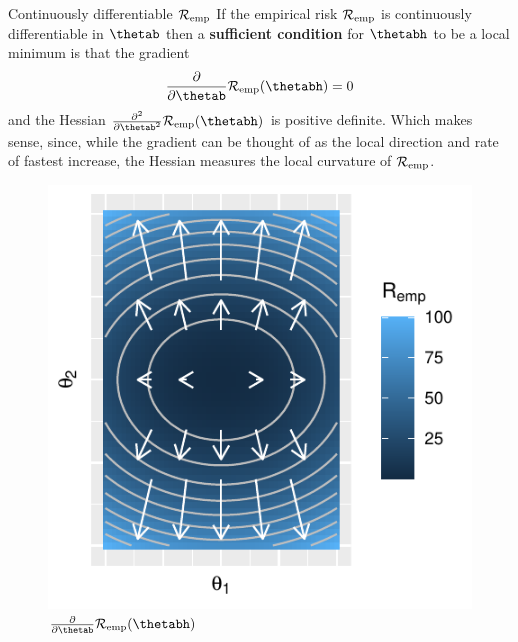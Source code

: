 \documentclass[11pt,compress,t,notes=noshow, xcolor=table]{beamer}
\begin{document}
\begin{vbframe}{Continuously differentiable $\mathcal{R}_{\text{emp}}$}
\footnotesize
If the empirical risk $\mathcal{R}_{\text{emp}}$ is continuously differentiable in $\thetab$ then a \textbf{sufficient condition} for $\thetabh$ to be a local minimum is that the gradient 
\[
\frac{\partial}{\partial\thetab}\riske(\thetabh) = 0
\]
and the Hessian $\frac{\partial^2}{\partial\thetab^2}\riske(\thetabh)$ is positive definite. Which makes sense, since, while the gradient can be thought of as the local direction and rate of fastest increase, the Hessian measures the local curvature of $\mathcal{R}_{\text{emp}}$.

\begin{figure}[!htb]
  \includegraphics[width=\linewidth]{figure/grad}
  \caption*{\footnotesize$\frac{\partial}{\partial\thetab}\riske(\thetabh)$}
\endminipage\hfill
{}

\end{figure}
\end{vbframe}
\end{document}
